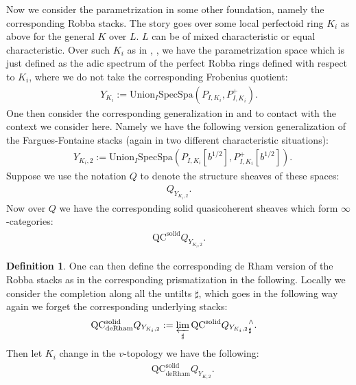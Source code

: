 \documentclass[12pt]{article}
\theoremstyle{definition}
\newtheorem{definition}{Definition}
\begin{document}
\noindent Now we consider the parametrization in some other foundation, namely the corresponding Robba stacks. The story goes over some local perfectoid ring $K_i$ as above for the general $K$ over $L$. $L$ can be of mixed characteristic or equal characteristic. Over such $K_i$ as in \cite{1KL}, \cite{1KL1}, we have the parametrization space which is just defined as the adic spectrum of the perfect Robba rings defined with respect to $K_i$, where we do not take the corresponding Frobenius quotient:
\begin{align}
Y_{K_i}:=\mathrm{Union}_I\mathrm{SpecSpa}(P_{I,K_i},P_{I,K_i}^+).
\end{align}
One then consider the corresponding generalization in \cite{1BS1} and \cite{1F2} to contact with the context we consider here. Namely we have the following version generalization of the Fargues-Fontaine stacks (again in two different characteristic situations):
\begin{align}
&Y_{K_i,2}:=\mathrm{Union}_I\mathrm{SpecSpa}(P_{I,K_i}[b^{1/2}],P_{I,K_i}^+[b^{1/2}]).
\end{align}
Suppose we use the notation $Q$ to denote the structure sheaves of these spaces:
\begin{align}
Q_{Y_{K_i,2}}.
\end{align}
Now over $Q$ we have the corresponding solid quasicoherent sheaves which form $\infty$-categories:
\begin{align}
\mathrm{QC}^\mathrm{solid}Q_{Y_{K_i,2}}.
\end{align}

\begin{definition}
One can then define the corresponding de Rham version of the Robba stacks as in the corresponding prismatization in the following. Locally we consider the completion along all the untilts $\sharp$, which goes in the following way again we forget the corresponding underlying stacks:
\begin{align}
&\mathrm{QC}^\mathrm{solid}_{\mathrm{deRham}}Q_{Y_{K_i,2}}:=\varprojlim_{\sharp} \mathrm{QC}^\mathrm{solid}{Q_{Y_{K_i,2}}}^\wedge_\sharp.
\end{align}
Then let $K_i$ change in the $v$-topology we have the following:
\begin{align}
&\mathrm{QC}^\mathrm{solid}_{\mathrm{deRham}}Q_{Y_{K,2}}.
\end{align}
\end{definition}
\end{document}
